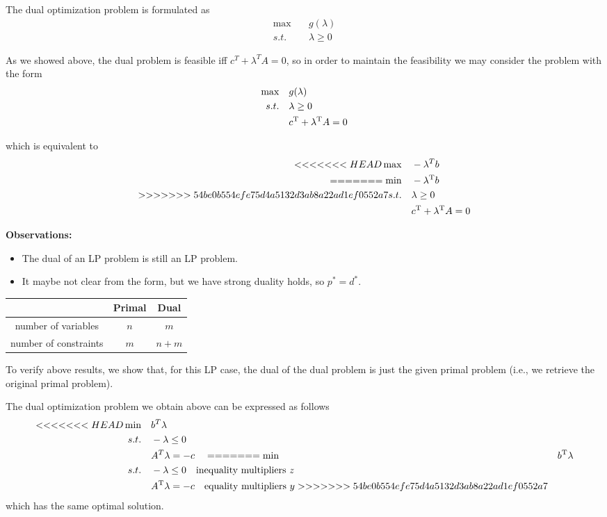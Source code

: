 The dual optimization problem is formulated as
\begin{align*}
\max\quad &g(\lambda)\\
s.t.\quad &\lambda \geq 0
\end{align*}

As we showed above, the dual problem is feasible iff $c^T+\lambda^TA=0$, so in order to maintain the feasibility we may consider the problem with the form
\begin{align*}
\max\quad &g(\lambda)\\
s.t.\quad &\lambda\geq 0\\
&c^{{\rm T}}+\lambda^{{\rm T}}A=0
\end{align*}

which is equivalent to
\begin{align*}
<<<<<<< HEAD
\max\quad &-\lambda^Tb\\
=======
\min\quad &-\lambda^{{\rm T}}b\\
>>>>>>> 54be0b554efe75d4a5132d3ab8a22ad1ef0552a7
s.t.\quad &\lambda\geq 0\\
&c^{{\rm T}}+\lambda^{{\rm T}}A=0
\end{align*}


\textbf{Observations:}
\begin{itemize}
	\item The dual of an LP problem is still an LP problem.
	
	\item It maybe not clear from the form, but we have strong duality holds, so $p^*=d^*$.
\end{itemize}

\begin{center}
\begin{tabular}{|c|c|c|}
	\hline 
	&Primal & Dual\\
	\hline  
	number of variables & $n$ & $m$\\
	\hline 
	number of constraints&$m$&$n+m$\\
	\hline 
\end{tabular}
\end{center}


\vspace{0.3cm}
To verify above results, we show that, for this LP case, the dual of the dual problem is just the given primal problem (i.e., we retrieve the original primal problem).

The dual optimization problem we obtain above can be expressed as follows
\begin{align*}
<<<<<<< HEAD
\min\quad &b^T\lambda\\
s.t.\quad &-\lambda\leq 0\quad\\
&A^T\lambda = -c\quad 
=======
\min\quad &b^{{\rm T}}\lambda\\
s.t.\quad &-\lambda\leq 0\quad\text{inequality multipliers }z\\
&A^{{\rm T}}\lambda = -c\quad \text{equality multipliers }y
>>>>>>> 54be0b554efe75d4a5132d3ab8a22ad1ef0552a7
\end{align*}
which has the same optimal solution.

